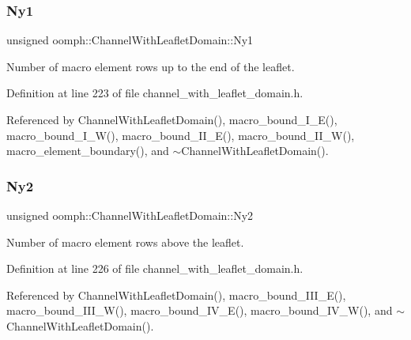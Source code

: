 \subsubsection{\texorpdfstring{Ny1}{Ny1}}
{\footnotesize\ttfamily unsigned oomph\+::\+Channel\+With\+Leaflet\+Domain\+::\+Ny1\hspace{0.3cm}{\ttfamily [protected]}}



Number of macro element rows up to the end of the leaflet. 



Definition at line 223 of file channel\+\_\+with\+\_\+leaflet\+\_\+domain.\+h.



Referenced by Channel\+With\+Leaflet\+Domain(), macro\+\_\+bound\+\_\+\+I\+\_\+\+E(), macro\+\_\+bound\+\_\+\+I\+\_\+\+W(), macro\+\_\+bound\+\_\+\+I\+I\+\_\+\+E(), macro\+\_\+bound\+\_\+\+I\+I\+\_\+\+W(), macro\+\_\+element\+\_\+boundary(), and $\sim$\+Channel\+With\+Leaflet\+Domain().

\mbox{\label{classoomph_1_1ChannelWithLeafletDomain_a1596a538b4263b42d20f9c098c5f2752}} 
\subsubsection{\texorpdfstring{Ny2}{Ny2}}
{\footnotesize\ttfamily unsigned oomph\+::\+Channel\+With\+Leaflet\+Domain\+::\+Ny2\hspace{0.3cm}{\ttfamily [protected]}}



Number of macro element rows above the leaflet. 



Definition at line 226 of file channel\+\_\+with\+\_\+leaflet\+\_\+domain.\+h.



Referenced by Channel\+With\+Leaflet\+Domain(), macro\+\_\+bound\+\_\+\+I\+I\+I\+\_\+\+E(), macro\+\_\+bound\+\_\+\+I\+I\+I\+\_\+\+W(), macro\+\_\+bound\+\_\+\+I\+V\+\_\+\+E(), macro\+\_\+bound\+\_\+\+I\+V\+\_\+\+W(), and $\sim$\+Channel\+With\+Leaflet\+Domain().

\mbox{\label{classoomph_1_1ChannelWithLeafletDomain_a165703af81538c28bbbd780d65bbb333}} 
